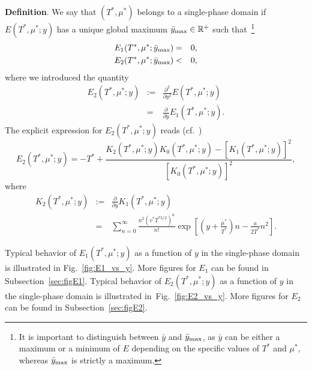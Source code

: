 \documentclass[12pt]{article}
\numberwithin{equation}{section}
\begin{document}
	\textbf{Definition}. We say that $(T^*, \mu^*)$ belongs to a single-phase domain if $E(T^*,\mu^*;y)$ has a unique global maximum $\bar{y}_{\rm max} \in \mathbb{R}^{+}$ such that~\footnote{It is important to distinguish between $\bar{y}$ and $\bar{y}_{\rm max}$, as $\bar{y}$ can be either a maximum or a minimum of $E$ depending on the specific values of $T^*$ and $\mu^*$, whereas $\bar{y}_{\rm max}$ is strictly a maximum.}
	\begin{eqnarray}
		\label{cond:max}
		E_1(T^*, \mu^*; \bar{y}_{\rm max}) & = & 0,
		\nonumber\\
		E_2(T^*, \mu^*;\bar{y}_{\rm max}) & < & 0,
	\end{eqnarray}
	where we introduced the quantity
	\begin{eqnarray}
		\label{def:E2}
		E_2(T^*, \mu^*;y) & := & \frac{\partial^2}{\partial y^2} E(T^*,\mu^*;y)
		\\
		& = & \frac{\partial}{\partial y} E_1(T^*,\mu^*;y).
		\nonumber
	\end{eqnarray}
	The explicit expression for $E_2(T^*,\mu^*;y)$ reads (cf.~\cite[(20)]{KD22})
	\begin{equation}
		\label{def:reducedE2}
		E_2(T^*,\mu^*;y) = -T^* + \frac{K_2(T^*,\mu^*;y) K_0(T^*,\mu^*;y) - [K_1(T^*,\mu^*;y)]^2}{[K_0(T^*,\mu^*;y)]^2},
	\end{equation}
	where
	\begin{eqnarray}
		K_2(T^*,\mu^*;y) & := & \frac{\partial}{\partial y} K_1(T^*,\mu^*;y)
		\nonumber\\
		& = & \sum_{n=0}^{\infty} \frac{n^2 (v^* T^{*3/2})^n}{n!} \exp[\left(y+\frac{\mu^*}{T^*}\right)n - \frac{a}{2T^*}n^2].
	\end{eqnarray}
	
	Typical behavior of $E_1(T^*,\mu^*;y)$ as a function of $y$ in the single-phase domain is illustrated in Fig.~\ref{fig:E1_vs_y}. More figures for $E_1$ can be found in Subsection~\ref{sec:figE1}.	
	Typical behavior of $E_2(T^*,\mu^*;y)$ as a function of $y$ in the single-phase domain is illustrated in~Fig.~\ref{fig:E2_vs_y}. More figures for $E_2$ can be found in Subsection~\ref{sec:figE2}.
	
\end{document}
